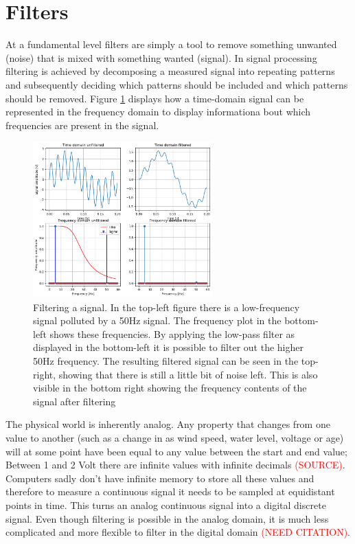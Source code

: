 \section{Filters}
At a fundamental level filters are simply a tool to remove something unwanted (noise) that is mixed with something wanted (signal). In signal processing filtering is achieved by decomposing a measured signal into repeating patterns and subsequently deciding which patterns should be included and which patterns should be removed. Figure \ref{fig:filter_example} displays how a time-domain signal can be represented in the frequency domain to display informationa bout which frequencies are present in the signal.

\begin{figure}[h!t]
	\begin{center}
		\includegraphics[height=60mm]{images/filter_example.png}
	\end{center}
	\caption{Filtering a signal. In the top-left figure there is a low-frequency signal polluted by a 50Hz signal. The frequency plot in the bottom-left shows these frequencies. By applying the low-pass filter as displayed in the bottom-left it is possible to filter out the higher 50Hz frequency. The resulting filtered signal can be seen in the top-right, showing that there is still a little bit of noise left. This is also visible in the bottom right showing the frequency contents of the signal after filtering}
	\label{fig:filter_example}
\end{figure}

The physical world is inherently analog. Any property that changes from one value to another (such as a change in as wind speed, water level, voltage or age) will at some point have been equal to any value between the start and end value; Between 1 and 2 Volt there are infinite values with infinite decimals \textcolor{red}{(SOURCE)}. Computers sadly don't have infinite memory to store all these values and therefore to measure a continuous signal it needs to be sampled at equidistant points in time. This turns an analog continuous signal into a digital discrete signal. Even though filtering is possible in the analog domain, it is much less complicated and more flexible to filter in the digital domain \textcolor{red}{(NEED CITATION)}.

